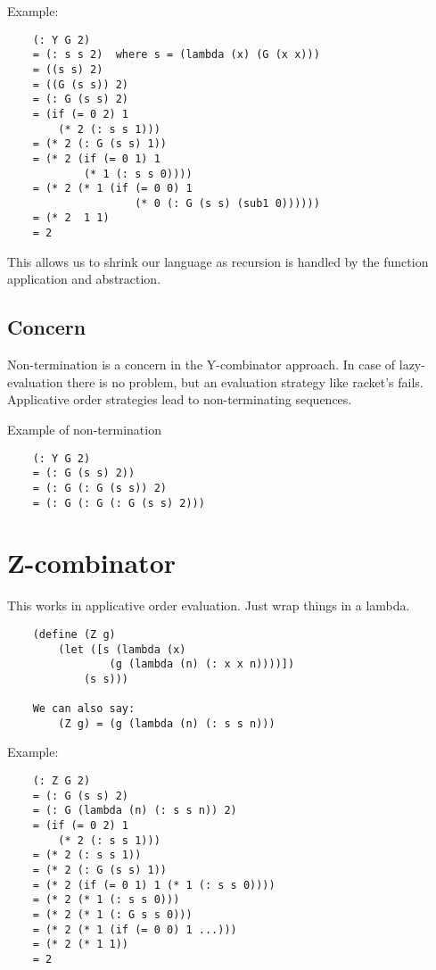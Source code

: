 Example:

\begin{lstlisting}
    (: Y G 2)
    = (: s s 2)  where s = (lambda (x) (G (x x)))
    = ((s s) 2)
    = ((G (s s)) 2)
    = (: G (s s) 2)
    = (if (= 0 2) 1
        (* 2 (: s s 1)))
    = (* 2 (: G (s s) 1))
    = (* 2 (if (= 0 1) 1
            (* 1 (: s s 0))))
    = (* 2 (* 1 (if (= 0 0) 1
                    (* 0 (: G (s s) (sub1 0))))))
    = (* 2  1 1)
    = 2
\end{lstlisting}

This allows us to shrink our language as recursion is handled by
the function application and abstraction.

\subsection{Concern}

Non-termination is a concern in the Y-combinator approach.
In case of lazy-evaluation there is no problem, but an evaluation
strategy like racket's fails. Applicative order strategies lead to
non-terminating sequences.

Example of non-termination

\begin{lstlisting}
    (: Y G 2)
    = (: G (s s) 2))
    = (: G (: G (s s)) 2)
    = (: G (: G (: G (s s) 2)))
\end{lstlisting}
\section{Z-combinator}

This works in applicative order evaluation. Just wrap things in a lambda.

\begin{lstlisting}
    (define (Z g)
        (let ([s (lambda (x)
                (g (lambda (n) (: x x n))))])
            (s s)))

    We can also say:
        (Z g) = (g (lambda (n) (: s s n)))
\end{lstlisting}

Example:

\begin{lstlisting}
    (: Z G 2)
    = (: G (s s) 2)
    = (: G (lambda (n) (: s s n)) 2)
    = (if (= 0 2) 1
        (* 2 (: s s 1)))
    = (* 2 (: s s 1))
    = (* 2 (: G (s s) 1))
    = (* 2 (if (= 0 1) 1 (* 1 (: s s 0))))
    = (* 2 (* 1 (: s s 0)))
    = (* 2 (* 1 (: G s s 0)))
    = (* 2 (* 1 (if (= 0 0) 1 ...)))
    = (* 2 (* 1 1))
    = 2
\end{lstlisting}
